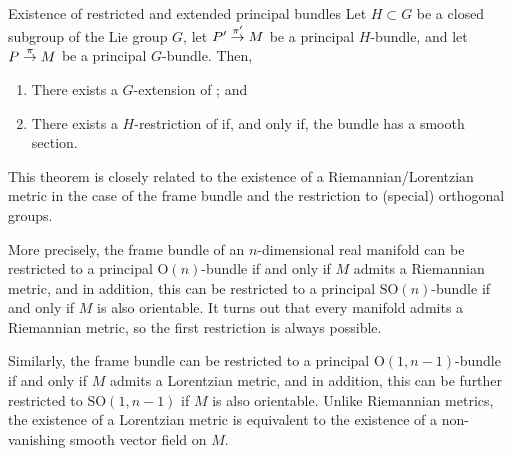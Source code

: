 \begin{theorem}{Existence of restricted and extended principal bundles}{}
    Let \(H \subset G\) be a closed subgroup of the Lie group \(G\), let \(P' \mathrel{\overset{\pi'}{\to}} M\) be a principal \(H\)-bundle, and let \(P \mathrel{\overset{\pi}{\to}} M\) be a principal \(G\)-bundle. Then,
    \begin{enumerate}[label=(\alph*)]
        \item There exists a \(G\)-extension of ; and
        \item There exists a \(H\)-restriction of  if, and only if, the bundle  has a smooth section.
    \end{enumerate}
\end{theorem}
\begin{remark}
    This theorem is closely related to the existence of a Riemannian/Lorentzian metric in the case of the frame bundle and the restriction to (special) orthogonal groups.

    More precisely, the frame bundle  of an \(n\)-dimensional real manifold can be restricted to a principal \(\mathrm{O}(n)\)-bundle if and only if \(M\) admits a Riemannian metric, and in addition, this can be restricted to a principal \(\mathrm{SO}(n)\)-bundle if and only if \(M\) is also orientable. It turns out that every manifold admits a Riemannian metric, so the first restriction is always possible.

    Similarly, the frame bundle can be restricted to a principal \(\mathrm{O}(1,n-1)\)-bundle if and only if \(M\) admits a Lorentzian metric, and in addition, this can be further restricted to \(\mathrm{SO}(1,n-1)\) if \(M\) is also orientable. Unlike Riemannian metrics, the existence of a Lorentzian metric is equivalent\cite{oneill_semi_riemannian} to the existence of a non-vanishing smooth vector field on \(M\).
\end{remark}
